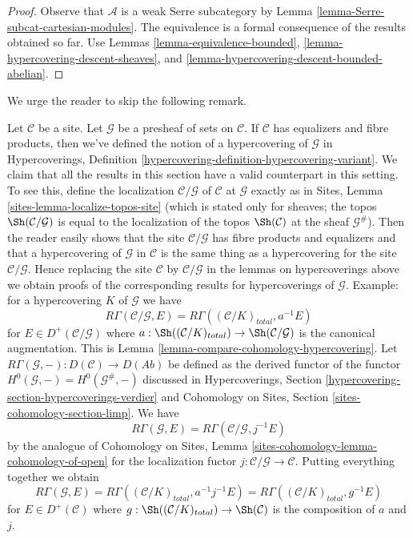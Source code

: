 \begin{proof}
Observe that $\mathcal{A}$ is a weak Serre subcategory by
Lemma \ref{lemma-Serre-subcat-cartesian-modules}.
The equivalence is a
formal consequence of the results obtained so far. Use
Lemmas \ref{lemma-equivalence-bounded},
\ref{lemma-hypercovering-descent-sheaves}, and
\ref{lemma-hypercovering-descent-bounded-abelian}.
\end{proof}

\noindent
We urge the reader to skip the following remark.

\begin{remark}
\label{remark-compare-cohomology-hypercovering-presheaf}
Let $\mathcal{C}$ be a site. Let $\mathcal{G}$ be a presheaf of sets on
$\mathcal{C}$. If $\mathcal{C}$ has equalizers and fibre products, then
we've defined the notion of a hypercovering of $\mathcal{G}$ in
Hypercoverings, Definition \ref{hypercovering-definition-hypercovering-variant}.
We claim that all the results in this section have a
valid counterpart in this setting.
To see this,
define the localization $\mathcal{C}/\mathcal{G}$
of $\mathcal{C}$ at $\mathcal{G}$ exactly as in
Sites, Lemma \ref{sites-lemma-localize-topos-site}
(which is stated only for sheaves; the topos
$\Sh(\mathcal{C}/\mathcal{G})$ is equal to the localization
of the topos $\Sh(\mathcal{C})$ at the sheaf $\mathcal{G}^\#$).
Then the reader easily shows that the site
$\mathcal{C}/\mathcal{G}$ has fibre products and equalizers
and that a hypercovering of $\mathcal{G}$ in $\mathcal{C}$
is the same thing as a hypercovering for the site $\mathcal{C}/\mathcal{G}$.
Hence replacing the site $\mathcal{C}$ by $\mathcal{C}/\mathcal{G}$
in the lemmas on hypercoverings above we obtain proofs of the
corresponding results for hypercoverings of $\mathcal{G}$.
Example: for a hypercovering $K$ of $\mathcal{G}$ we have
$$
R\Gamma(\mathcal{C}/\mathcal{G}, E) =
R\Gamma((\mathcal{C}/K)_{total}, a^{-1}E)
$$
for $E \in D^+(\mathcal{C}/\mathcal{G})$ where
$a : \Sh((\mathcal{C}/K)_{total}) \to \Sh(\mathcal{C}/\mathcal{G})$
is the canonical augmentation. This is
Lemma \ref{lemma-compare-cohomology-hypercovering}.
Let $R\Gamma(\mathcal{G}, -) : D(\mathcal{C}) \to D(\textit{Ab})$
be defined as the derived functor of the functor
$H^0(\mathcal{G}, -) = H^0(\mathcal{G}^\#, -)$
discussed in Hypercoverings, Section
\ref{hypercovering-section-hypercoverings-verdier} and
Cohomology on Sites, Section \ref{sites-cohomology-section-limp}.
We have
$$
R\Gamma(\mathcal{G}, E) = R\Gamma(\mathcal{C}/\mathcal{G}, j^{-1}E)
$$
by the analogue of Cohomology on Sites, Lemma
\ref{sites-cohomology-lemma-cohomology-of-open}
for the localization fuctor $j : \mathcal{C}/\mathcal{G} \to \mathcal{C}$.
Putting everything together we obtain
$$
R\Gamma(\mathcal{G}, E) =
R\Gamma((\mathcal{C}/K)_{total}, a^{-1}j^{-1}E) =
R\Gamma((\mathcal{C}/K)_{total}, g^{-1}E)
$$
for $E \in D^+(\mathcal{C})$ where
$g : \Sh((\mathcal{C}/K)_{total}) \to \Sh(\mathcal{C})$
is the composition of $a$ and $j$.
\end{remark}







